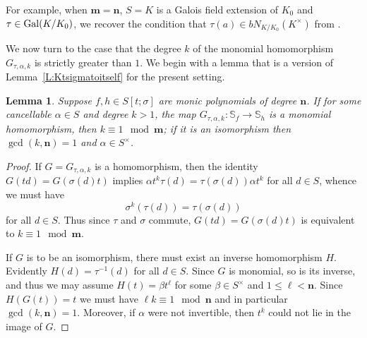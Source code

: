 \documentclass[11pt]{amsart}
\theoremstyle{plain}
\newtheorem{lemma}[theorem]{Lemma}
\theoremstyle{definition}
\numberwithin{equation}{section}
\numberwithin{figure}{section}
\newcommand{\Sf}{\Stsigma/\Stsigma f(t)} %
\newcommand{\ring}{S}
\newcommand{\field}{K}
\newcommand{\Stsigma}{S[t;\sigma]}
\newcommand{\os}{\mathbf{m}}  %
\newcommand{\de}{\mathbf{n}}  %
\begin{document}
For example, when $\os=\de$, $\ring=\field$ is a Galois field extension of $\field_0$ and $\tau\in {\rm Gal}(\field/\field_0)$, we recover the condition that $\tau(a) \in b N_{\field/\field_0}(\field^\times)$ from  \cite[Corollary 32]{BrownPumpluen2018}.


We now turn to the case that the degree $k$ of the monomial homomorphism $G_{\tau,\alpha,k}$ is strictly greater than $1$.
We begin with a lemma that is a version of Lemma~\ref{L:Ktsigmatoitself} for the present setting.

\begin{lemma}\label{L:k=1}
    Suppose $f,h\in \Stsigma$ are monic polynomials of degree $\de$.  If for some cancellable $\alpha\in \ring$ and degree $k>1$, the map $G_{\tau,\alpha,k}:\mathbb{S}_f\to\mathbb{S}_h$
    is a monomial homomorphism, then $k\equiv 1 \mod \os$; if it is an isomorphism then $\gcd(k,\de)=1$ and $\alpha\in \ring^\times$.
\end{lemma}



\begin{proof}
    If $G=G_{\tau,\alpha,k}$ is a homomorphism, then the identity $G(td)=G(\sigma(d)t)$ implies $\alpha t^k \tau(d) = \tau(\sigma(d)) \alpha t^k$ for all $d\in \ring$, whence we must have
$$
\sigma^k(\tau(d)) = \tau(\sigma(d))
$$
for all $d\in \ring$.  Thus since $\tau$ and $\sigma$ commute, $G(td)=G(\sigma(d)t)$ is equivalent to  $k \equiv 1 \mod \os$.

If $G$ is to be an isomorphism, there must exist an inverse homomorphism $H$.
Evidently $H(d)=\tau^{-1}(d)$ for all $d\in \ring$.  Since $G$ is monomial, so is its inverse, and thus we may assume $H(t)=\beta t^\ell$ for some $\beta \in \ring^\times$ and $1\leq \ell < \de$.  Since $H(G(t))=t$ we must have $\ell k \equiv 1 \mod \de$ and in particular $\gcd(k,\de)=1$. Moreover, if $\alpha$ were not invertible, then $t^k$ could not lie in the image of $G$.
\end{proof}
\end{document}
